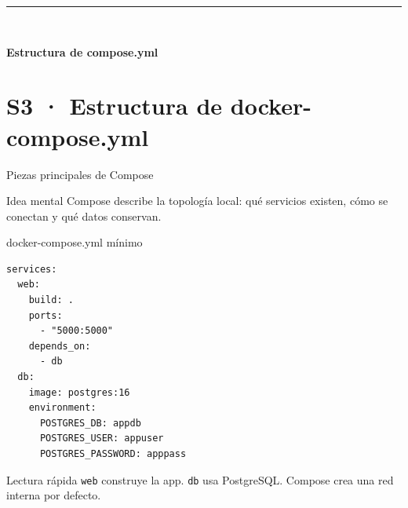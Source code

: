 \documentclass[aspectratio=169]{beamer}
\newcommand{\MainHeaderSlide}[2]{%
  \begingroup
  \setbeamercolor{background canvas}{bg=white}
  \begin{frame}[plain]
    \vfill
    \hspace*{0.9cm}%
    \begin{minipage}{0.78\paperwidth}
      {\color{UUblack}\rule{4cm}{1.3pt}}\\[14pt]
      {\raggedright\color{UUblack}\fontsize{36}{42}\selectfont\rmfamily\bfseries #1\par}
    \end{minipage}
    \vfill
  \end{frame}
  \endgroup
}
\begin{document}
\MainHeaderSlide{Estructura de compose.yml}{Servicios, redes, volúmenes y dependencias}
\section{S3 · Estructura de docker-compose.yml}

\begin{frame}{Piezas principales de Compose}
  \begin{center}
  \end{center}
  \vspace{0.1cm}
  \begin{block}{Idea mental}
    Compose describe la topología local: qué servicios existen, cómo se conectan y qué datos conservan.
  \end{block}
\end{frame}

\begin{frame}[fragile]{docker-compose.yml mínimo}
\begin{lstlisting}[style=terminal, basicstyle=\ttfamily\tiny]
services:
  web:
    build: .
    ports:
      - "5000:5000"
    depends_on:
      - db
  db:
    image: postgres:16
    environment:
      POSTGRES_DB: appdb
      POSTGRES_USER: appuser
      POSTGRES_PASSWORD: apppass
\end{lstlisting}
  \vspace{-0.08cm}
  \begin{alertblock}{Lectura rápida}
    \texttt{web} construye la app. \texttt{db} usa PostgreSQL. Compose crea una red interna por defecto.
  \end{alertblock}
\end{frame}
\end{document}
